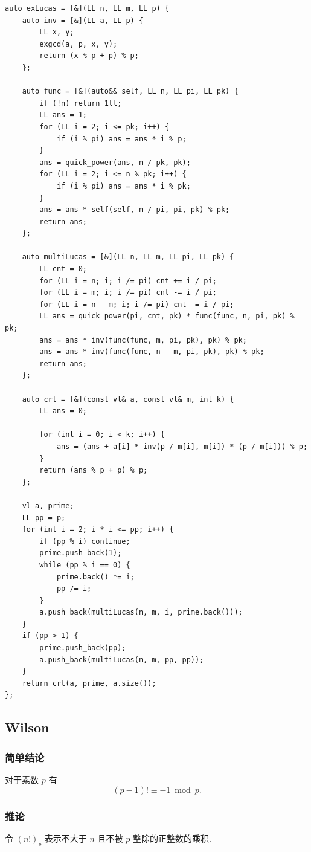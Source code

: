 \documentclass[UTF8, a4paper, titlepage, twoside]{ctexart}
\begin{document}
\begin{lstlisting}[style=cpp]
auto exLucas = [&](LL n, LL m, LL p) {
    auto inv = [&](LL a, LL p) {
        LL x, y;
        exgcd(a, p, x, y);
        return (x % p + p) % p;
    };

    auto func = [&](auto&& self, LL n, LL pi, LL pk) {
        if (!n) return 1ll;
        LL ans = 1;
        for (LL i = 2; i <= pk; i++) {
            if (i % pi) ans = ans * i % p;
        }
        ans = quick_power(ans, n / pk, pk);
        for (LL i = 2; i <= n % pk; i++) {
            if (i % pi) ans = ans * i % pk;
        }
        ans = ans * self(self, n / pi, pi, pk) % pk;
        return ans;
    };

    auto multiLucas = [&](LL n, LL m, LL pi, LL pk) {
        LL cnt = 0;
        for (LL i = n; i; i /= pi) cnt += i / pi;
        for (LL i = m; i; i /= pi) cnt -= i / pi;
        for (LL i = n - m; i; i /= pi) cnt -= i / pi;
        LL ans = quick_power(pi, cnt, pk) * func(func, n, pi, pk) % pk;
        ans = ans * inv(func(func, m, pi, pk), pk) % pk;
        ans = ans * inv(func(func, n - m, pi, pk), pk) % pk;
        return ans;
    };

    auto crt = [&](const vl& a, const vl& m, int k) {
        LL ans = 0;

        for (int i = 0; i < k; i++) {
            ans = (ans + a[i] * inv(p / m[i], m[i]) * (p / m[i])) % p;
        }
        return (ans % p + p) % p;
    };

    vl a, prime;
    LL pp = p;
    for (int i = 2; i * i <= pp; i++) {
        if (pp % i) continue;
        prime.push_back(1);
        while (pp % i == 0) {
            prime.back() *= i;
            pp /= i;
        }
        a.push_back(multiLucas(n, m, i, prime.back()));
    }
    if (pp > 1) {
        prime.push_back(pp);
        a.push_back(multiLucas(n, m, pp, pp));
    }
    return crt(a, prime, a.size());
};
\end{lstlisting}

\subsection{ Wilson }
\subsubsection*{ 简单结论 }

对于素数 \(p\) 有 \[(p - 1)!\equiv-1\bmod p.\]

\subsubsection*{ 推论 }
令 \((n!)_p\) 表示不大于 \(n\) 且不被 \(p\) 整除的正整数的乘积.
\end{document}
